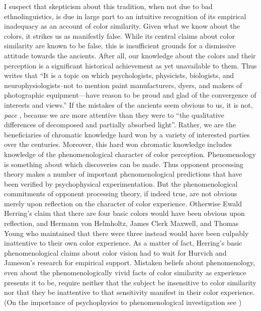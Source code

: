 I suspect that skepticism about this tradition, when not due to bad ethnolinguistics, is due in large part to an intuitive recognition of its empirical inadequacy as an account of color similarity. Given what we know about the colors, it strikes us as manifestly false. While its central claims about color similarity are known to be false, this is insufficient grounds for a dismissive attitude towards the ancients. After all, our knowledge about the colors and their perception is a significant historical achievement as yet unavailable to them. Thus \citet[291]{Broackes:2010uq} writes that ``It is a topic on which psychologists, physicists, biologists, and neurophysiologists--not to mention paint manufacturers, dyers, and makers of photographic equipment---have reason to be proud and glad of the convergence of interests and views.'' If the mistakes of the ancients seem obvious to us, it is not, \emph{pace} \citet[162]{Platnauer:1921bh}, because we are more attentive than they were to ``the qualitative differences of decomposed and partially absorbed light''. Rather, we are the beneficiaries of chromatic knowledge hard won by a variety of interested parties over the centuries. Moreover, this hard won chromatic knowledge includes knowledge of the phenomenological character of color perception. Phenomenology is something about which discoveries can be made. Thus opponent processing theory makes a number of important phenomenological predictions that have been verified by psychophysical experimentation. But the phenomenological commitments of opponent processing theory, if indeed true, are not obvious merely upon reflection on the character of color experience. Otherwise Ewald Herring's claim that there are four basic colors would have been obvious upon reflection, and Hermann von Helmholtz, James Clerk Maxwell, and Thomas Young who maintained that there were three instead would have been culpably inattentive to their own color experience. As a matter of fact, Herring's basic phenomenological claims about color vision had to wait for Hurvich and Jameson's research for empirical support. Mistaken beliefs about phenomenology, even about the phenomenologically vivid facts of color similarity as experience presents it to be, require neither that the subject be insensitive to color similarity nor that they be inattentive to that sensitivity manifest in their color experience. (On the importance of psychophysics to phenomenological investigation see \citealt{Hilbert:2007qy,Phillips:2012af})

